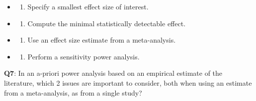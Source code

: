 \documentclass[
  letterpaper,
  DIV=11,
  numbers=noendperiod]{scrreprt}
\providecommand{\tightlist}{%
  \setlength{\itemsep}{0pt}\setlength{\parskip}{0pt}}\usepackage{longtable,booktabs,array}
\begin{document}
\begin{itemize}
\item
  \begin{enumerate}
  \def\labelenumi{(\Alph{enumi})}
  \tightlist
  \item
    Specify a smallest effect size of interest.\\
  \end{enumerate}
\item
  \begin{enumerate}
  \def\labelenumi{(\Alph{enumi})}
  \setcounter{enumi}{1}
  \tightlist
  \item
    Compute the minimal statistically detectable effect.\\
  \end{enumerate}
\item
  \begin{enumerate}
  \def\labelenumi{(\Alph{enumi})}
  \setcounter{enumi}{2}
  \tightlist
  \item
    Use an effect size estimate from a meta-analysis.\\
  \end{enumerate}
\item
  \begin{enumerate}
  \def\labelenumi{(\Alph{enumi})}
  \setcounter{enumi}{3}
  \tightlist
  \item
    Perform a sensitivity power analysis.\\
  \end{enumerate}
\end{itemize}

\textbf{Q7}: In an a-priori power analysis based on an empirical
estimate of the literature, which 2 issues are important to consider,
both when using an estimate from a meta-analysis, as from a single
study?
\end{document}
